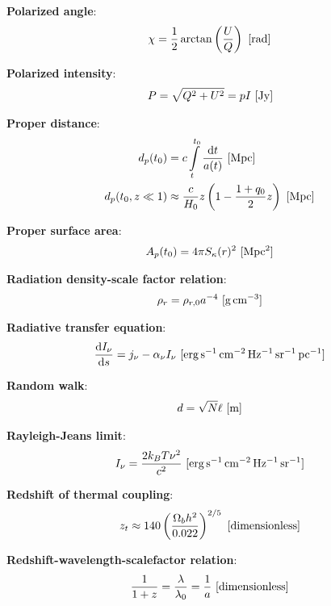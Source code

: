 \documentclass[a4paper,11pt]{article}
\begin{document}
{\noindent}\textbf{Polarized angle}:
\begin{align*}
    \chi = \frac{1}{2}\arctan\left(\frac{U}{Q}\right) ~ [{\rm rad}]
\end{align*}

{\noindent}\textbf{Polarized intensity}:
\begin{align*}
    P = \sqrt{Q^2 + U^2} = pI ~ [{\rm Jy}]
\end{align*}

{\noindent}\textbf{Proper distance}:
\begin{align*}
    d_p(t_0) &= c\int\limits_t^{t_0}\frac{\mathrm{d}t}{a(t)} ~ [{\rm Mpc}] \\
    d_p(t_0,z\ll1) &\approx \frac{c}{H_0}z \left(1-\frac{1+q_0}{2}z\right) ~ [{\rm Mpc}]
\end{align*}

{\noindent}\textbf{Proper surface area}:
\begin{align*}
    A_p(t_0) = 4\pi S_\kappa(r)^2 ~ [{\rm Mpc^2}]
\end{align*}

{\noindent}\textbf{Radiation density-scale factor relation}:
\begin{align*}
    \rho_r = \rho_{r,0}a^{-4} ~ [{\rm g\,cm^{-3}}]
\end{align*}

{\noindent}\textbf{Radiative transfer equation}:
\begin{align*}
    \frac{\mathrm{d}I_\nu}{\mathrm{d}s} = j_\nu - \alpha_\nu I_\nu ~ [{\rm erg\,s^{-1}\,cm^{-2}\,Hz^{-1}\,sr^{-1}\,pc^{-1}}]
\end{align*}

{\noindent}\textbf{Random walk}:
\begin{align*}
    d = \sqrt{N}\ell ~ [{\rm m}]
\end{align*}

{\noindent}\textbf{Rayleigh-Jeans limit}:
\begin{align*}
    I_\nu = \frac{2k_BT\nu^2}{c^2} ~ [{\rm erg\,s^{-1}\,cm^{-2}\,Hz^{-1}\,sr^{-1}}]
\end{align*}

{\noindent}\textbf{Redshift of thermal coupling}:
\begin{align*}
    z_t \approx 140\left(\frac{\Omega_bh^2}{0.022}\right)^{2/5} ~ [{\rm dimensionless}]
\end{align*}

{\noindent}\textbf{Redshift-wavelength-scalefactor relation}:
\begin{align*}
    \frac{1}{1+z} = \frac{\lambda}{\lambda_0} = \frac{1}{a} ~ [{\rm dimensionless}]
\end{align*}
\end{document}
